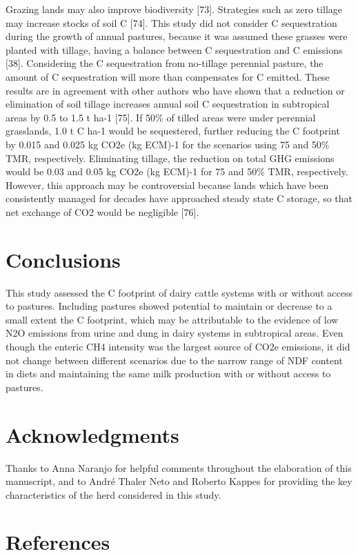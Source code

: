 \documentclass[11pt,a4paper]{article}
\begin{document}
Grazing lands may also improve biodiversity [73]. Strategies such as zero tillage may increase stocks of soil C [74]. This study did not consider C sequestration during the growth of annual pastures, because it was assumed these grasses were planted with tillage, having a balance between C sequestration and C emissions [38]. Considering the C sequestration from no-tillage perennial pasture, the amount of C sequestration will more than compensates for C emitted. These results are in agreement with other authors who have shown that a reduction or elimination of soil tillage increases annual soil C sequestration in subtropical areas by 0.5 to 1.5 t ha-1 [75]. If 50\% of tilled areas were under perennial grasslands, 1.0 t C ha-1 would be sequestered, further reducing the C footprint by 0.015 and 0.025 kg CO2e (kg ECM)-1 for the scenarios using 75 and 50\% TMR, respectively. Eliminating tillage, the reduction on total GHG emissions would be 0.03 and 0.05 kg CO2e (kg ECM)-1 for 75 and 50\% TMR, respectively. However, this approach may be controversial because lands which have been consistently managed for decades have approached steady state C storage, so that net exchange of CO2 would be negligible [76].

\section{Conclusions}

This study assessed the C footprint of dairy cattle systems with or without access to pastures. Including pastures showed potential to maintain or decrease to a small extent the C footprint, which may be attributable to the evidence of low N2O emissions from urine and dung in dairy systems in subtropical areas. Even though the enteric CH4 intensity was the largest source of CO2e emissions, it did not change between different scenarios due to the narrow range of NDF content in diets and maintaining the same milk production with or without access to pastures.

\section{Acknowledgments}

Thanks to Anna Naranjo for helpful comments throughout the elaboration of this manuscript, and to André Thaler Neto and Roberto Kappes for providing the key characteristics of the herd considered in this study.

\section{References}
\end{document}
